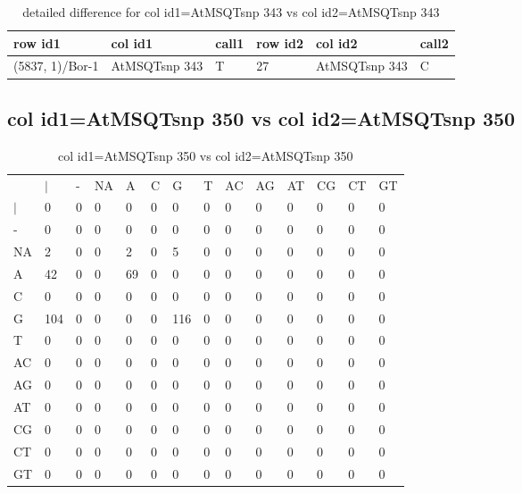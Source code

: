 \begin{center}
\begin{longtable}{|l|l|l|l|l|l|}
\caption{detailed difference for col id1=AtMSQTsnp 343 vs col id2=AtMSQTsnp 343} \label{table_dm865}\\
\hline
row id1&col id1&call1&row id2&col id2&call2\\
\hline
(5837, 1)/Bor-1&AtMSQTsnp 343&T&27&AtMSQTsnp 343&C\\
\hline
\end{longtable}
\end{center}

\subsection{col id1=AtMSQTsnp 350 vs col id2=AtMSQTsnp 350}
\begin{center}
\begin{longtable}{|l|l|l|l|l|l|l|l|l|l|l|l|l|l|}
\caption{col id1=AtMSQTsnp 350 vs col id2=AtMSQTsnp 350} \label{table_dm866}\\
\hline
\\
\hline
&$|$&-&NA&A&C&G&T&AC&AG&AT&CG&CT&GT\\
$|$&0&0&0&0&0&0&0&0&0&0&0&0&0\\
-&0&0&0&0&0&0&0&0&0&0&0&0&0\\
NA&2&0&0&2&0&5&0&0&0&0&0&0&0\\
A&42&0&0&69&0&0&0&0&0&0&0&0&0\\
C&0&0&0&0&0&0&0&0&0&0&0&0&0\\
G&104&0&0&0&0&116&0&0&0&0&0&0&0\\
T&0&0&0&0&0&0&0&0&0&0&0&0&0\\
AC&0&0&0&0&0&0&0&0&0&0&0&0&0\\
AG&0&0&0&0&0&0&0&0&0&0&0&0&0\\
AT&0&0&0&0&0&0&0&0&0&0&0&0&0\\
CG&0&0&0&0&0&0&0&0&0&0&0&0&0\\
CT&0&0&0&0&0&0&0&0&0&0&0&0&0\\
GT&0&0&0&0&0&0&0&0&0&0&0&0&0\\
\hline
\end{longtable}
\end{center}

